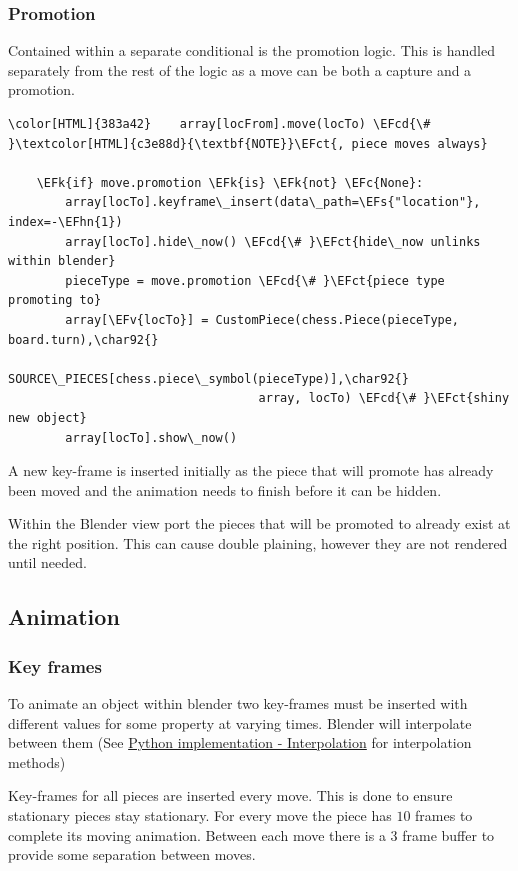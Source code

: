\documentclass[11pt]{article}
\newcommand{\EFk}[1]{\textcolor{EFk}{#1}} %
\newcommand{\EFs}[1]{\textcolor{EFs}{#1}} %
\newcommand{\EFct}[1]{\textcolor{EFct}{#1}} %
\newcommand{\EFc}[1]{\textcolor{EFc}{#1}} %
\newcommand{\EFv}[1]{\textcolor{EFv}{#1}} %
\newcommand{\EFcd}[1]{\textcolor{EFcd}{#1}} %
\newcommand{\EFhn}[1]{\textcolor{EFhn}{\textbf{#1}}} %
\begin{document}
\subsubsection{Promotion}
\label{sec:org157df4f}
Contained within a separate conditional is the promotion logic. This is handled
separately from the rest of the logic as a move can be both a capture and a
promotion.
\begin{Code}
\begin{Verbatim}[]
\color[HTML]{383a42}    array[locFrom].move(locTo) \EFcd{\# }\textcolor[HTML]{c3e88d}{\textbf{NOTE}}\EFct{, piece moves always}

    \EFk{if} move.promotion \EFk{is} \EFk{not} \EFc{None}:
        array[locTo].keyframe\_insert(data\_path=\EFs{"location"}, index=-\EFhn{1})
        array[locTo].hide\_now() \EFcd{\# }\EFct{hide\_now unlinks within blender}
        pieceType = move.promotion \EFcd{\# }\EFct{piece type promoting to}
        array[\EFv{locTo}] = CustomPiece(chess.Piece(pieceType, board.turn),\char92{}
                                   SOURCE\_PIECES[chess.piece\_symbol(pieceType)],\char92{}
                                   array, locTo) \EFcd{\# }\EFct{shiny new object}
        array[locTo].show\_now()
\end{Verbatim}
\end{Code}
A new key-frame is inserted initially as the piece that will promote has already
been moved and the animation needs to finish before it can be hidden.

Within the Blender view port the pieces that will be promoted to already exist
at the right position. This can cause double plaining, however they are not
rendered until needed.
\subsection{Animation}
\label{sec:org10ff813}
\subsubsection{Key frames}
\label{sec:orgc50e98a}
To animate an object within blender two key-frames must be inserted with
different values for some property at varying times. Blender will
interpolate between them (See \hyperref[sec:orge070c77]{Python implementation - Interpolation} for
interpolation methods)

Key-frames for all pieces are inserted every move. This is done to ensure
stationary pieces stay stationary. For every move the piece has \(10\) frames to
complete its moving animation. Between each move there is a \(3\) frame buffer to provide
some separation between moves.
\end{document}
